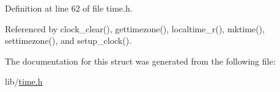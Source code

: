 Definition at line 62 of file time.\-h.



Referenced by clock\-\_\-clear(), gettimezone(), localtime\-\_\-r(), mktime(), settimezone(), and setup\-\_\-clock().



The documentation for this struct was generated from the following file\-:\begin{DoxyCompactItemize}
\item 
lib/\hyperlink{time_8h}{time.\-h}\end{DoxyCompactItemize}
